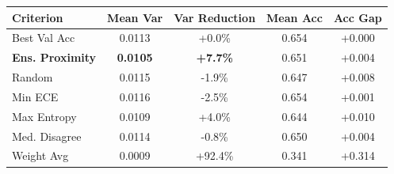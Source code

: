 \begin{tabular}{lcccc}
\toprule
Criterion & Mean Var & Var Reduction & Mean Acc & Acc Gap \\
\midrule
Best Val Acc & 0.0113 & +0.0\% & 0.654 & +0.000 \\
\textbf{Ens. Proximity} & \textbf{0.0105} & \textbf{+7.7\%} & 0.651 & +0.004 \\
Random & 0.0115 & -1.9\% & 0.647 & +0.008 \\
Min ECE & 0.0116 & -2.5\% & 0.654 & +0.001 \\
Max Entropy & 0.0109 & +4.0\% & 0.644 & +0.010 \\
Med. Disagree & 0.0114 & -0.8\% & 0.650 & +0.004 \\
Weight Avg & 0.0009 & +92.4\% & 0.341 & +0.314 \\
\bottomrule
\end{tabular}